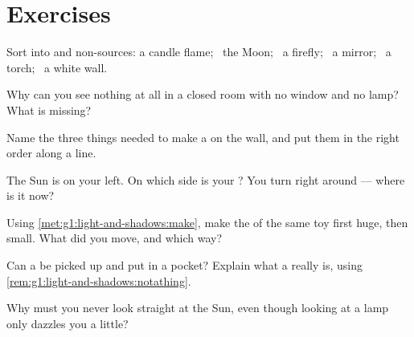 \section{Exercises}

\begin{exercise}[$\star$]\label{exo:g1:light-and-shadows:1}
Sort into  and non-sources: a candle flame; \ the Moon;
\ a firefly; \ a mirror; \ a torch; \ a white wall.
\end{exercise}

\begin{exercise}[$\star$]\label{exo:g1:light-and-shadows:2}
Why can you see nothing at all in a closed room with no window and no
lamp? What is missing?
\end{exercise}

\begin{exercise}[$\star$]\label{exo:g1:light-and-shadows:3}
Name the three things needed to make a  on the wall, and put
them in the right order along a line.
\end{exercise}

\begin{exercise}[$\star$]\label{exo:g1:light-and-shadows:4}
The Sun is on your left. On which side is your ? You turn
right around --- where is it now?
\end{exercise}

\begin{exercise}[$\star$]\label{exo:g1:light-and-shadows:5}
Using \cref{met:g1:light-and-shadows:make}, make the  of the
same toy first huge, then small. What did you move, and which way?
\end{exercise}

\begin{exercise}[$\star$]\label{exo:g1:light-and-shadows:6}
Can a  be picked up and put in a pocket? Explain what a 
really is, using \cref{rem:g1:light-and-shadows:notathing}.
\end{exercise}

\begin{exercise}[$\star$]\label{exo:g1:light-and-shadows:7}
Why must you never look straight at the Sun, even though looking at a
lamp only dazzles you a little?
\end{exercise}

